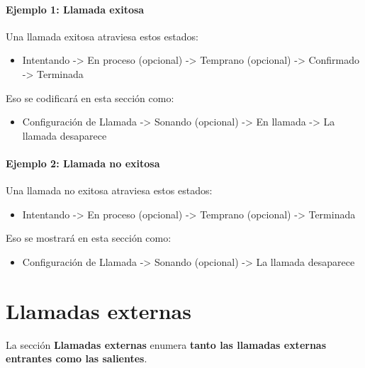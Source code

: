 \documentclass[letterpaper,10pt,spanish]{sphinxmanual}
\begin{document}
\paragraph{Ejemplo 1: Llamada exitosa}

Una llamada exitosa atraviesa estos estados:
\begin{itemize}
\item {} 
Intentando -\textgreater{} En proceso (opcional) -\textgreater{} Temprano (opcional) -\textgreater{} Confirmado -\textgreater{} Terminada

\end{itemize}

Eso se codificará en esta sección como:
\begin{itemize}
\item {} 
Configuración de Llamada -\textgreater{} Sonando (opcional) -\textgreater{} En llamada -\textgreater{} La llamada desaparece

\end{itemize}
\paragraph{Ejemplo 2: Llamada no exitosa}

Una llamada no exitosa atraviesa estos estados:
\begin{itemize}
\item {} 
Intentando -\textgreater{} En proceso (opcional) -\textgreater{} Temprano (opcional) -\textgreater{} Terminada

\end{itemize}

Eso se mostrará en esta sección como:
\begin{itemize}
\item {} 
Configuración de Llamada -\textgreater{} Sonando (opcional) -\textgreater{} La llamada desaparece

\end{itemize}
\label{administration_portal/platform/external_calls:external-calls}

\section{Llamadas externas}
\label{administration_portal/platform/external_calls:id2}\label{administration_portal/platform/external_calls:external-calls}\label{administration_portal/platform/external_calls::doc}\label{administration_portal/platform/external_calls:id1}
La sección \textbf{Llamadas externas} enumera \textbf{tanto las llamadas externas entrantes como las salientes}.
\end{document}
